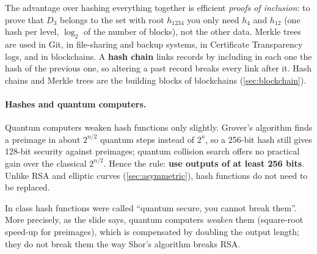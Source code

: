 The advantage over hashing everything together is efficient \emph{proofs of inclusion}: to prove that $D_3$ belongs to the set with root $h_{1234}$ you only need $h_4$ and $h_{12}$ (one hash per level, $\log_2$ of the number of blocks), not the other data. Merkle trees are used in Git, in file-sharing and backup systems, in Certificate Transparency logs, and in blockchains. A \textbf{hash chain} links records by including in each one the hash of the previous one, so altering a past record breaks every link after it. Hash chains and Merkle trees are the building blocks of blockchains (\cref{sec:blockchain}).

\paragraph{Hashes and quantum computers.} Quantum computers weaken hash functions only slightly. Grover's algorithm finds a preimage in about $2^{n/2}$ quantum steps instead of $2^n$, so a 256-bit hash still gives 128-bit security against preimages; quantum collision search offers no practical gain over the classical $2^{n/2}$. Hence the rule: \textbf{use outputs of at least 256 bits}. Unlike RSA and elliptic curves (\cref{sec:asymmetric}), hash functions do not need to be replaced.

\begin{remark}
In class hash functions were called \enquote{quantum secure, you cannot break them}. More precisely, as the slide says, quantum computers \emph{weaken} them (square-root speed-up for preimages), which is compensated by doubling the output length; they do not break them the way Shor's algorithm breaks RSA.
\end{remark}

